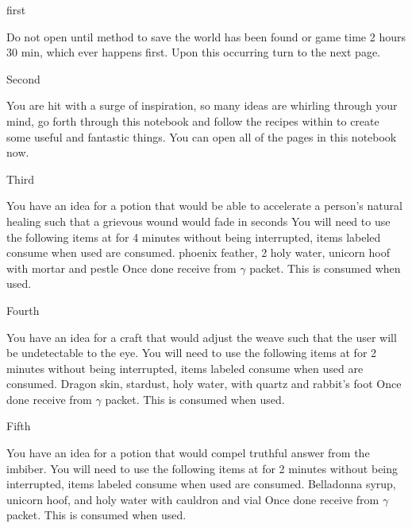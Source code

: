 \documentclass[greennotebook]{guildcamp3} %
\begin{document}
\startnotebook{\nMagTwoRecipes{}}

\begin{page}{first}
	
	Do not open until method to save the world has been found or game time 2 hours 30 min, which ever happens first. Upon this occurring turn to the next page.
	
\end{page}

\begin{page}{Second}
	
	You are hit with a surge of inspiration, so many ideas are whirling through your mind, go forth through this notebook and follow the recipes within to create some useful and fantastic things. You can open all of the pages in this notebook now.
	
\end{page}

\begin{page}{Third}
	
	You have an idea for a potion that would be able to accelerate a person's natural healing such that a grievous wound would fade in seconds
	You will need to use the following items at \sMageWorkbench{} for 4 minutes without being interrupted, items labeled consume when used are consumed.
	phoenix feather, 2 holy water, unicorn hoof with mortar and pestle
	Once done receive \iHealthRemedy{} from $\gamma$ packet. This is consumed when used. 
	
\end{page}

\begin{page}{Fourth}
	
	You have an idea for a craft that would adjust the weave such that the user will be undetectable to the eye.
	You will need to use the following items at\sMageWorkbench{} for 2 minutes without being interrupted, items labeled consume when used are consumed.
	Dragon skin, stardust, holy water, with quartz and rabbit's foot
	Once done receive \iInvisibilityCloak{} from $\gamma$ packet. This is consumed when used. 
	
\end{page}

\begin{page}{Fifth}
	
	You have an idea for a potion that would compel truthful answer from the imbiber.
	You will need to use the following items at \sMageWorkbench{} for 2 minutes without being interrupted, items labeled consume when used are consumed.
	Belladonna syrup, unicorn hoof, and holy water with cauldron and vial
	Once done receive \iTruthPotion{} from $\gamma$ packet. This is consumed when used. 
	
\end{page}
\end{document}
